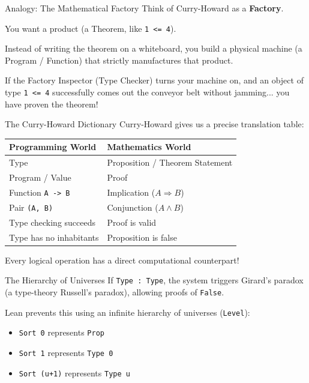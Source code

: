 \documentclass[10pt,aspectratio=169]{beamer}
\begin{document}
\begin{frame}[fragile]{Analogy: The Mathematical Factory}
    Think of Curry-Howard as a \textbf{Factory}. 
    
    \vspace{1em}
    You want a product (a Theorem, like \verb|1 <= 4|). 
    
    Instead of writing the theorem on a whiteboard, you build a physical machine (a Program / Function) that strictly manufactures that product. 
    
    \vspace{1em}
    If the Factory Inspector (Type Checker) turns your machine on, and an object of type \verb|1 <= 4| successfully comes out the conveyor belt without jamming... you have proven the theorem!
\end{frame}

\begin{frame}[fragile]{The Curry-Howard Dictionary}
    Curry-Howard gives us a precise translation table:
    
    \vspace{0.5em}
    \begin{center}
    \begin{tabular}{l l}
        \toprule
        \textbf{Programming World} & \textbf{Mathematics World} \\
        \midrule
        Type & Proposition / Theorem Statement \\
        Program / Value & Proof \\
        Function \verb|A -> B| & Implication ($A \Rightarrow B$) \\
        Pair \verb|(A, B)| & Conjunction ($A \wedge B$) \\
        Type checking succeeds & Proof is valid \\
        Type has no inhabitants & Proposition is false \\
        \bottomrule
    \end{tabular}
    \end{center}
    
    \vspace{0.5em}
    Every logical operation has a direct computational counterpart!
\end{frame}

\begin{frame}[fragile]{The Hierarchy of Universes}
    If \verb|Type : Type|, the system triggers Girard's paradox (a type-theory Russell's paradox), allowing proofs of \verb|False|.
    
    Lean prevents this using an infinite hierarchy of universes (\verb|Level|):
    \begin{itemize}
        \item \verb|Sort 0| represents \verb|Prop|
        \item \verb|Sort 1| represents \verb|Type 0|
        \item \verb|Sort (u+1)| represents \verb|Type u|
    \end{itemize}
\end{frame}
\end{document}
